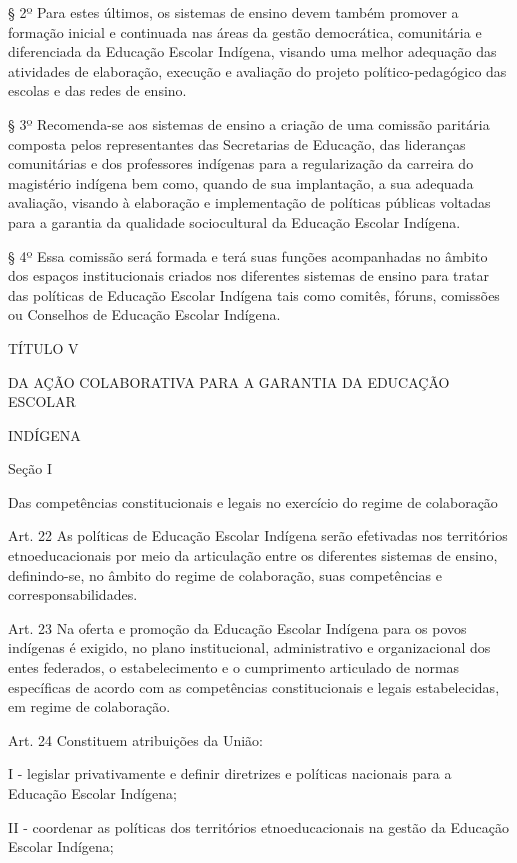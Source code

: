 \documentclass[
]{book}
\begin{document}
§ 2º Para estes últimos, os sistemas de ensino devem também promover a formação inicial e continuada nas áreas da gestão democrática, comunitária e diferenciada da Educação Escolar Indígena, visando uma melhor adequação das atividades de elaboração, execução e avaliação do projeto político-pedagógico das escolas e das redes de ensino.

§ 3º Recomenda-se aos sistemas de ensino a criação de uma comissão paritária composta pelos representantes das Secretarias de Educação, das lideranças comunitárias e dos professores indígenas para a regularização da carreira do magistério indígena bem como, quando de sua implantação, a sua adequada avaliação, visando à elaboração e implementação de políticas públicas voltadas para a garantia da qualidade sociocultural da Educação Escolar Indígena.

§ 4º Essa comissão será formada e terá suas funções acompanhadas no âmbito dos espaços institucionais criados nos diferentes sistemas de ensino para tratar das políticas de Educação Escolar Indígena tais como comitês, fóruns, comissões ou Conselhos de Educação Escolar Indígena.

TÍTULO V

DA AÇÃO COLABORATIVA PARA A GARANTIA DA EDUCAÇÃO ESCOLAR

INDÍGENA

Seção I

Das competências constitucionais e legais no exercício do regime de colaboração

Art. 22 As políticas de Educação Escolar Indígena serão efetivadas nos territórios etnoeducacionais por meio da articulação entre os diferentes sistemas de ensino, definindo-se, no âmbito do regime de colaboração, suas competências e corresponsabilidades.

Art. 23 Na oferta e promoção da Educação Escolar Indígena para os povos indígenas é exigido, no plano institucional, administrativo e organizacional dos entes federados, o estabelecimento e o cumprimento articulado de normas específicas de acordo com as competências constitucionais e legais estabelecidas, em regime de colaboração.

Art. 24 Constituem atribuições da União:

I - legislar privativamente e definir diretrizes e políticas nacionais para a Educação Escolar Indígena;

II - coordenar as políticas dos territórios etnoeducacionais na gestão da Educação Escolar Indígena;
\end{document}
